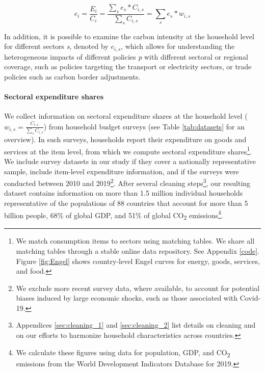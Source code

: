 \documentclass[12pt, a4paper]{article}
\begin{document}

\begin{equation} \label{eq:ei}
e_{i} = \frac{E_{i}}{C_{i}} = \frac{\sum_{s} e_{s}*C_{i,s}}{\sum_{s} C_{i,s}} = \sum_{s} e_{s}*w_{i,s}
\end{equation}


In addition, it is possible to examine the carbon intensity at the household level for different sectors \textit{s}, denoted by $e_{i,s}$, which allows for understanding the heterogeneous impacts of different policies \textit{p} with different sectoral or regional coverage, such as policies targeting the transport or electricity sectors, or trade policies such as carbon border adjustments.

\paragraph{Sectoral expenditure shares} We collect information on sectoral expenditure shares at the household level ($w_{i,s}=\frac{C_{i,s}}{\sum_{s}C_{i,s}}$) from household budget surveys (see Table \ref{tab:datasets} for an overview). In such surveys, households report their expenditure on goods and services at the item level, from which we compute sectoral expenditure shares\footnote{We match consumption items to sectors using matching tables. We share all matching tables through a stable online data repository. See Appendix \ref{code}. Figure \ref{fig:Engel} shows country-level Engel curves for energy, goods, services, and food.}. We include survey datasets in our study if they cover a nationally representative sample, include item-level expenditure information, and if the surveys were conducted between 2010 and 2019\footnote{We exclude more recent survey data, where available, to account for potential biases induced by large economic shocks, such as those associated with Covid-19.}. After several cleaning steps\footnote{Appendices \ref{sec:cleaning_1} and \ref{sec:cleaning_2} list details on cleaning and on our efforts to harmonize household characteristics across countries.}, our resulting dataset contains information on more than 1.5 million individual households representative of the populations of 88 countries that account for more than 5 billion people, 68\% of global GDP, and 51\% of global CO\textsubscript{2} emissions\footnote{We calculate these figures using data for population, GDP, and CO\textsubscript{2} emissions from the World Development Indicators Database \autocite{WorldBankGroup.2023} for 2019.}.
\end{document}
